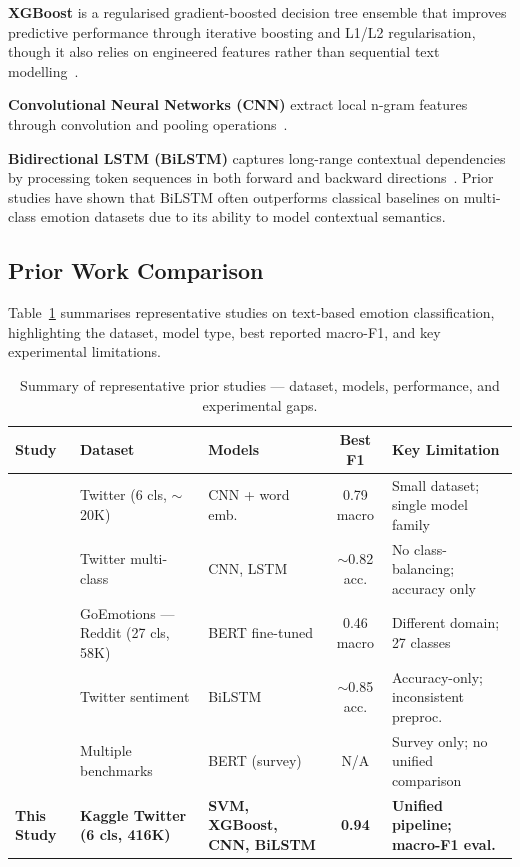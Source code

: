 \noindent\textbf{XGBoost} is a regularised gradient-boosted decision tree ensemble that improves predictive performance through iterative boosting and L1/L2 regularisation, though it also relies on engineered features rather than sequential text modelling~\citep{chen2016xgboost}.

\noindent\textbf{Convolutional Neural Networks (CNN)} extract local n-gram features through convolution and pooling operations~\citep{hasan2019emotion}.

\noindent\textbf{Bidirectional LSTM (BiLSTM)} captures long-range contextual dependencies by processing token sequences in both forward and backward directions~\citep{sun2023bidirectional}. Prior studies have shown that BiLSTM often outperforms classical baselines on multi-class emotion datasets due to its ability to model contextual semantics.

\subsection{Prior Work Comparison}

Table~\ref{tab:prior_work} summarises representative studies on text-based emotion classification, highlighting the dataset, model type, best reported macro-F1, and key experimental limitations.

\begin{table}[!htbp]
\centering
\caption{Summary of representative prior studies --- dataset, models, performance, and experimental gaps.}
\label{tab:prior_work}
\footnotesize
\setlength{\tabcolsep}{4pt}
\begin{tabular}{@{}p{3.2cm}p{3.2cm}p{2.8cm}cp{4.2cm}@{}}
\toprule
\textbf{Study} & \textbf{Dataset} & \textbf{Models} & \textbf{Best F1} & \textbf{Key Limitation} \\
\midrule
\citet{saravia2018carer} & Twitter (6 cls, $\sim$20K) & CNN + word emb. & 0.79 macro & Small dataset; single model family \\
\citet{hasan2019emotion} & Twitter multi-class & CNN, LSTM & $\sim$0.82 acc. & No class-balancing; accuracy only \\
\citet{demszky2020goemotions} & GoEmotions --- Reddit (27 cls, 58K) & BERT fine-tuned & 0.46 macro & Different domain; 27 classes \\
\citet{sun2023bidirectional} & Twitter sentiment & BiLSTM & $\sim$0.85 acc. & Accuracy-only; inconsistent preproc. \\
\citet{acheampong2021transformer} & Multiple benchmarks & BERT (survey) & N/A & Survey only; no unified comparison \\
\midrule
\textbf{This Study} & \textbf{Kaggle Twitter (6 cls, 416K)} & \textbf{SVM, XGBoost, CNN, BiLSTM} & \textbf{0.94} & \textbf{Unified pipeline; macro-F1 eval.} \\
\bottomrule
\end{tabular}
\end{table}


